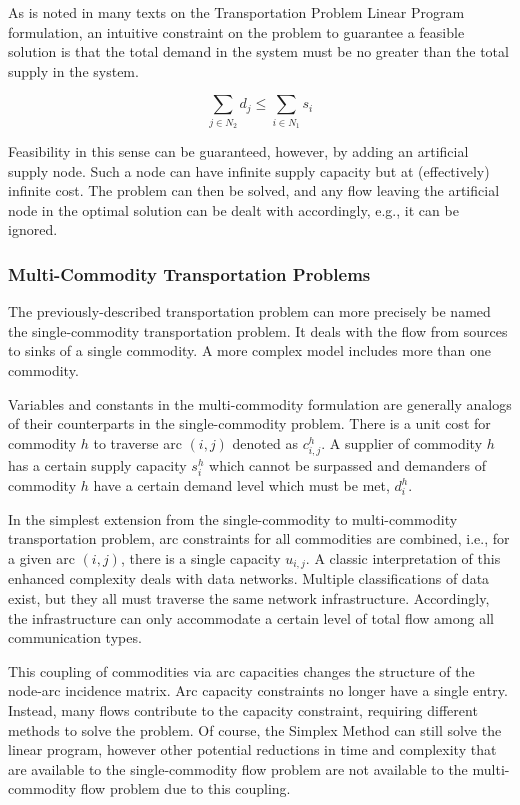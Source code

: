 As is noted in many texts on the Transportation Problem Linear Program
formulation, an intuitive constraint on the problem to guarantee a feasible
solution is that the total demand in the system must be no greater than the
total supply in the system.

\begin{equation}
  \sum_{j \in N_2} d_j \leq \sum_{i \in N_1} s_i
\end{equation}

Feasibility in this sense can be guaranteed, however, by adding an artificial
supply node. Such a node can have infinite supply capacity but at (effectively)
infinite cost. The problem can then be solved, and any flow leaving the
artificial node in the optimal solution can be dealt with accordingly, e.g., it
can be ignored.

\subsubsection{Multi-Commodity Transportation Problems}\label{sec:MCTP}
The previously-described transportation problem can more precisely be named the
single-commodity transportation problem. It deals with the flow from sources to
sinks of a single commodity. A more complex model includes more than one
commodity.

Variables and constants in the multi-commodity formulation are generally analogs
of their counterparts in the single-commodity problem. There is a unit cost for
commodity $h$ to traverse arc $(i,j)$ denoted as $c_{i,j}^{h}$. A supplier of
commodity $h$ has a certain supply capacity $s_i^h$ which cannot be surpassed
and demanders of commodity $h$ have a certain demand level which must be met,
$d_i^h$.

In the simplest extension from the single-commodity to multi-commodity
transportation problem, arc constraints for all commodities are combined, i.e.,
for a given arc $(i, j)$, there is a single capacity $u_{i,j}$. A classic
interpretation of this enhanced complexity deals with data networks. Multiple
classifications of data exist, but they all must traverse the same network
infrastructure. Accordingly, the infrastructure can only accommodate a certain
level of total flow among all communication types.

This coupling of commodities via arc capacities changes the structure of the
node-arc incidence matrix. Arc capacity constraints no longer have a single
entry. Instead, many flows contribute to the capacity constraint, requiring
different methods to solve the problem. Of course, the Simplex Method can still
solve the linear program, however other potential reductions in time and
complexity that are available to the single-commodity flow problem are not
available to the multi-commodity flow problem due to this coupling.

